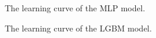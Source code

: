 \begin{figure}
    \centering
    \caption{The learning curve of the MLP model.}
    \label{fig:ann_curve}
\end{figure}

\begin{figure}
    \centering
    \caption{The learning curve of the LGBM model.}
    \label{fig:lgbm_curve}
\end{figure}

